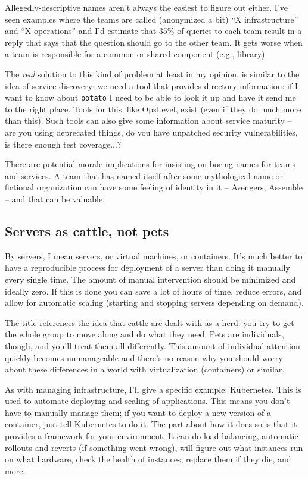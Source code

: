Allegedly-descriptive names aren't always the easiest to figure out either. I've seen examples where the teams are called (anonymized a bit) ``X infrastructure'' and ``X operations'' and I'd estimate that 35\% of queries to each team result in a reply that says that the question should go to the other team. It gets worse when a team is responsible for a common or shared component (e.g., library). 

The \textit{real} solution to this kind of problem at least in my opinion, is similar to the idea of service discovery: we need a tool that provides directory information: if I want to know about \texttt{potato} I need to be able to look it up and have it send me to the right place. Tools for this, like OpsLevel, exist (even if they do much more than this). Such tools can also give some information about service maturity -- are you using deprecated things, do you have unpatched security vulnerabilities, is there enough test coverage...?

There are potential morale implications for insisting on boring names for teams and services. A team that has named itself after some mythological name or fictional organization can have some feeling of identity in it -- Avengers, Assemble -- and that can be valuable. 

\subsection*{Servers as cattle, not pets}
By servers, I mean servers, or virtual machines, or containers. It's much better to have a reproducible process for deployment of a server than doing it manually every single time. The amount of manual intervention should be minimized and ideally zero. If this is done you can save a lot of hours of time, reduce errors, and allow for automatic scaling (starting and stopping servers depending on demand).

The title references the idea that cattle are dealt with as a herd: you try to get the whole group to move along and do what they need. Pets are individuals, though, and you'll treat them all differently. This amount of individual attention quickly becomes unmanageable and there's no reason why you should worry about these differences in a world with virtualization (containers) or similar. 

As with managing infrastructure, I'll give a specific example: Kubernetes. This is used to automate deploying and scaling of applications. This means you don't have to manually manage them; if you want to deploy a new version of a container, just tell Kubernetes to do it. The part about how it does so is that it provides a framework for your environment. It can do load balancing, automatic rollouts and reverts (if something went wrong), will figure out what instances run on what hardware, check the health of instances, replace them if they die, and more.

